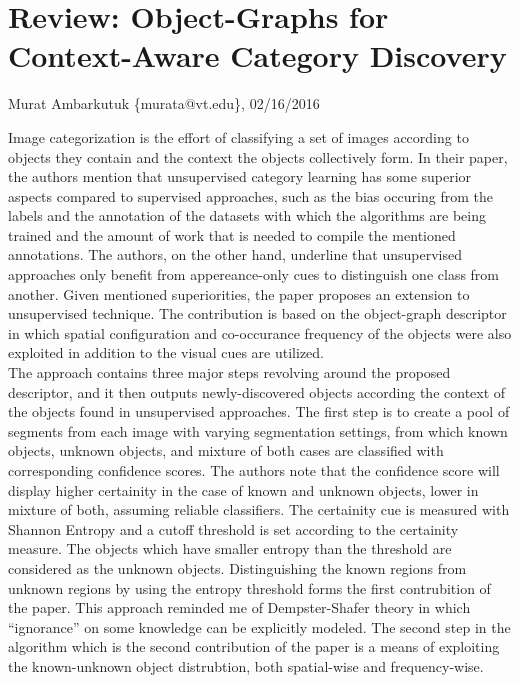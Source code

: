 \documentclass[11pt]{article}
\begin{document}
\thispagestyle{empty}
\section*{Review: Object-Graphs for Context-Aware Category Discovery}
\begin{flushright}
	\small{Murat Ambarkutuk \{murata@vt.edu\}, 02/16/2016}
\end{flushright}
Image categorization is the effort of classifying a set of images according to objects they contain and the context the objects collectively form.
In their paper, the authors mention that unsupervised category learning has some superior aspects compared to supervised approaches, such as the bias occuring from the labels and the annotation of the datasets with which the algorithms are being trained and the amount of work that is needed to compile the mentioned annotations.
The authors, on the other hand, underline that unsupervised approaches only benefit from appereance-only cues to distinguish one class from another.
Given mentioned superiorities, the paper proposes an extension to unsupervised technique.
The contribution is based on the object-graph descriptor in which spatial configuration and co-occurance frequency of the objects were also exploited in addition to the visual cues are utilized.\@ \\
\indent The approach contains three major steps revolving around the proposed descriptor, and it then outputs newly-discovered objects according the context of the objects found in unsupervised approaches. %
The first step is to create a pool of segments from each image with varying segmentation settings, from which known objects, unknown objects, and mixture of both cases are classified with corresponding confidence scores.
The authors note that the confidence score will display higher certainity in the case of known and unknown objects, lower in mixture of both, assuming reliable classifiers.
The certainity cue is measured with Shannon Entropy and a cutoff threshold is set according to the certainity measure.
The objects which have smaller entropy than the threshold are considered as the unknown objects.
Distinguishing the known regions from unknown regions by using the entropy threshold forms the first contrubition of the paper.
This approach reminded me of Dempster-Shafer theory in which ``ignorance'' on some knowledge can be explicitly modeled.
The second step in the algorithm which is the second contribution of the paper is a means of exploiting the known-unknown object distrubtion, both spatial-wise and frequency-wise.
\end{document}
